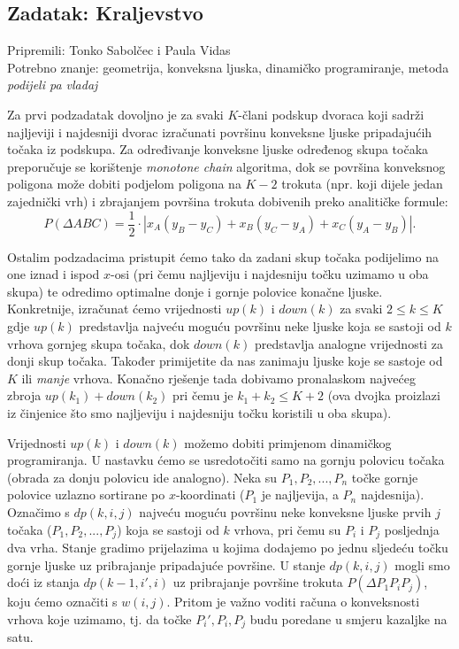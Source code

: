 \subsection*{Zadatak: Kraljevstvo}
\textsf{Pripremili: Tonko Sabolčec i Paula Vidas}\\
\textsf{Potrebno znanje: geometrija, konveksna ljuska, dinamičko programiranje, metoda \textit{podijeli pa vladaj}}

Za prvi podzadatak dovoljno je za svaki $K$-člani podskup dvoraca koji sadrži
najljeviji i najdesniji dvorac izračunati površinu konveksne ljuske pripadajućih
točaka iz podskupa. Za određivanje konveksne ljuske određenog skupa točaka
preporučuje se korištenje \textit{monotone chain} algoritma, dok se površina
konveksnog poligona može dobiti podjelom poligona na $K - 2$ trokuta (npr.
koji dijele jedan zajednički vrh) i zbrajanjem površina trokuta dobivenih preko
analitičke formule:
\begin{equation*}
  P(\Delta ABC) = \frac{1}{2} \cdot |x_A(y_B - y_C) + x_B(y_C - y_A) + x_C(y_A - y_B)|.
\end{equation*}

Ostalim podzadacima pristupit ćemo tako da zadani skup točaka podijelimo na one
iznad i ispod $x$-osi (pri čemu najljeviju i najdesniju točku uzimamo u oba
skupa) te odredimo optimalne donje i gornje polovice konačne ljuske. Konkretnije,
izračunat ćemo vrijednosti $up(k)$ i $down(k)$ za svaki $2 \le k \le K$ gdje
$up(k)$ predstavlja najveću moguću površinu neke ljuske koja se sastoji od $k$
vrhova gornjeg skupa točaka, dok $down(k)$ predstavlja analogne vrijednosti za
donji skup točaka. Također primijetite da nas zanimaju ljuske koje se sastoje
od $K$ ili \textit{manje} vrhova. Konačno rješenje tada dobivamo pronalaskom najvećeg zbroja
$up(k_1) + down(k_2)$ pri čemu je $k_1 + k_2 \le K + 2$ (ova dvojka proizlazi iz
činjenice što smo najljeviju i najdesniju točku koristili u oba skupa).

Vrijednosti $up(k)$ i $down(k)$ možemo dobiti primjenom dinamičkog programiranja.
U nastavku ćemo se usredotočiti samo na gornju polovicu točaka (obrada za donju
polovicu ide analogno). Neka su $P_1, P_2, ..., P_n$ točke gornje polovice
uzlazno sortirane po $x$-koordinati ($P_1$ je najljevija, a $P_n$ najdesnija).
Označimo s $dp(k,i,j)$ najveću moguću površinu neke konveksne ljuske prvih
$j$ točaka ($P_1, P_2, ..., P_j$) koja se sastoji od $k$ vrhova, pri čemu su
$P_i$ i $P_j$ posljednja dva vrha. Stanje gradimo prijelazima u kojima dodajemo
po jednu sljedeću točku gornje ljuske uz pribrajanje pripadajuće površine.
U stanje $dp(k,i,j)$ mogli smo doći iz stanja $dp(k-1,i',i)$ uz pribrajanje
površine trokuta $P(\Delta P_1P_iP_j)$, koju ćemo označiti s $w(i, j)$.
Pritom je važno voditi računa o
konveksnosti vrhova koje uzimamo, tj. da točke $P_i', P_i, P_j$ budu poredane
u smjeru kazaljke na satu.

